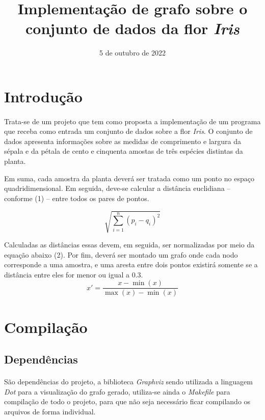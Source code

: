 \documentclass{article}
\title{Implementação de grafo sobre o conjunto de dados da flor {\it Iris\/}}
\author{\sc{Elian Babireski \& Vinícios Bidin}}
\date{5 de outubro de 2022}
\begin{document}
    \maketitle

    \section{Introdução}
        \paragraph{} Trata-se de um projeto que tem como proposta a implementação de um programa que receba como entrada um conjunto de dados sobre a flor {\it Iris}. O conjunto de dados apresenta informações sobre as medidas de comprimento e largura da sépala e da pétala de cento e cinquenta amostas de três espécies distintas da planta.
		\par Em suma, cada amostra da planta deverá ser tratada como um ponto no espaço quadridimensional. Em seguida, deve-se calcular a distância euclidiana – conforme (1) – entre todos os pares de pontos.

        \begin{equation}
            \sqrt{\sum_{i = 1} ^ n {(p_i - q_i)} ^ 2}
        \end{equation}

        Calculadas as distâncias essas devem, em seguida, ser normalizadas por meio da equação abaixo (2). Por fim, deverá ser montado um grafo onde cada nodo corresponde a uma amostra, e uma aresta entre dois pontos existirá somente se a distância entre eles for menor ou igual a 0.3.
        \begin{equation}
            x' = \frac{x - \min(x)}{\max(x) - \min(x)}
        \end{equation}

		\section{Compilação}
			\subsection{Dependências}
				\paragraph{} São dependências do projeto, a biblioteca {\it Graphviz} sendo utilizada a linguagem {\it Dot} para a visualização do grafo gerado, utiliza-se ainda o {\it Makefile} para compilação de todo o projeto, para que não seja necessário ficar compilando os arquivos de forma individual.
\end{document}

